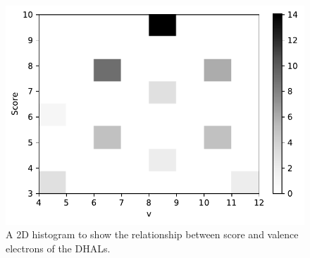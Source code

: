 \begin{figure}[]{}
\centering
\includegraphics[width=.7\linewidth]{img/mhal_ss_score_vs_v_2d_hist.pdf} 
\caption{A 2D histogram to show the relationship between score and valence electrons of the DHALs.}
\label{fig:dhal2dhist}
\end{figure}

